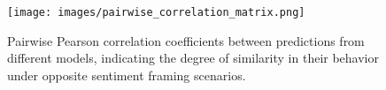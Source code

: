 \begin{figure}
    \centering
    \texttt{[image: images/pairwise\_correlation\_matrix.png]}
    \caption{Pairwise Pearson correlation coefficients between predictions from different models, indicating the degree of similarity in their behavior under opposite sentiment framing scenarios.}
    \label{fig:heatmap-models}
\end{figure}